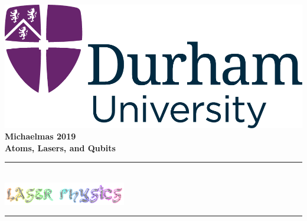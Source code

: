 \documentclass[a4paper, 11pt, normalem]{report}
\begin{document}
\begin{titlepage}
    \newcommand{\HRule}{\rule{\linewidth}{0.5mm}}
    \center
    {\includegraphics[scale=0.5]{../../logo0.png}\hfill{\Large\bfseries Michaelmas 2019}}\\[2cm]
    {\LARGE\bfseries Atoms, Lasers, and Qubits}\\[1.5cm]
    \HRule \\[0.3cm]
    {\includegraphics[width=0.4\textwidth]{lasers.png}}\\[0.1cm]
    \HRule \\[1.5cm]


\end{titlepage}
\end{document}
